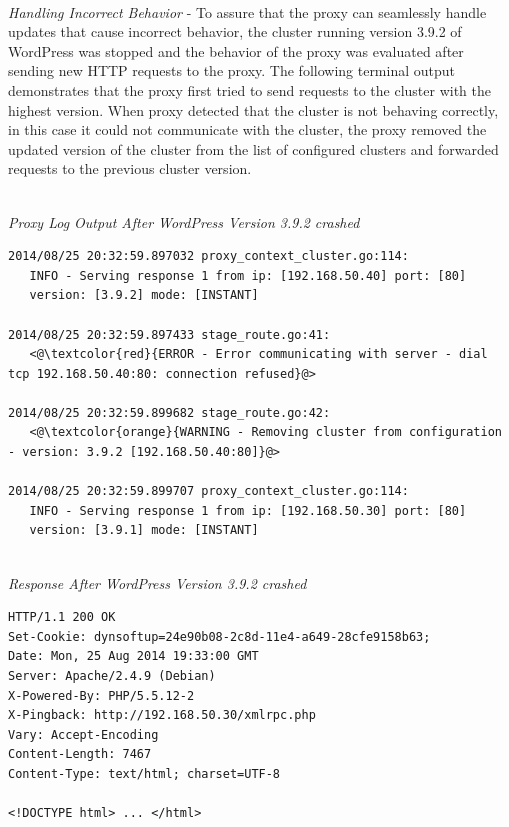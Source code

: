 \documentclass[a4paper,11pt,twoside]{report}
\begin{document}
\noindent\\
\textit{Handling Incorrect Behavior} - To assure that the proxy can seamlessly handle updates that cause incorrect behavior, the cluster running version 3.9.2 of WordPress was stopped and the behavior of the proxy was evaluated after sending new HTTP requests to the proxy. The following terminal output demonstrates that the proxy first tried to send requests to the cluster with the highest version. When proxy detected that the cluster is not behaving correctly, in this case it could not communicate with the cluster, the proxy removed the updated version of the cluster from the list of configured clusters and forwarded requests to the previous cluster version. 

\noindent\\
\textit{Proxy Log Output After WordPress Version 3.9.2 crashed}
\begin{lstlisting}[language=terminal]
2014/08/25 20:32:59.897032 proxy_context_cluster.go:114:     
   INFO - Serving response 1 from ip: [192.168.50.40] port: [80] 
   version: [3.9.2] mode: [INSTANT]
   
2014/08/25 20:32:59.897433 stage_route.go:41:    
   <@\textcolor{red}{ERROR - Error communicating with server - dial tcp 192.168.50.40:80: connection refused}@>

2014/08/25 20:32:59.899682 stage_route.go:42:  
   <@\textcolor{orange}{WARNING - Removing cluster from configuration - version: 3.9.2 [192.168.50.40:80]}@>

2014/08/25 20:32:59.899707 proxy_context_cluster.go:114:     
   INFO - Serving response 1 from ip: [192.168.50.30] port: [80] 
   version: [3.9.1] mode: [INSTANT]
\end{lstlisting}

\noindent\\
\textit{Response After WordPress Version 3.9.2 crashed}
\begin{lstlisting}[language=terminal]
HTTP/1.1 200 OK
Set-Cookie: dynsoftup=24e90b08-2c8d-11e4-a649-28cfe9158b63;
Date: Mon, 25 Aug 2014 19:33:00 GMT
Server: Apache/2.4.9 (Debian)
X-Powered-By: PHP/5.5.12-2
X-Pingback: http://192.168.50.30/xmlrpc.php
Vary: Accept-Encoding
Content-Length: 7467
Content-Type: text/html; charset=UTF-8

<!DOCTYPE html> ... </html>  
\end{lstlisting}
   
\end{document}
